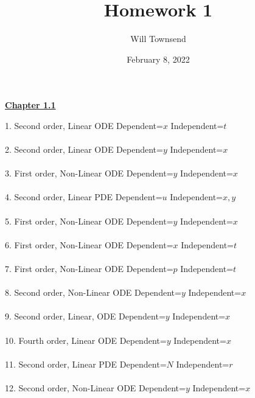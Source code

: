 \documentclass[12pt]{exam}
\title{Homework 1}
\author{Will Townsend}
\date{February 8, 2022}
\begin{document}
\maketitle

\begin{center}\Large{\textbf{\underline{Chapter 1.1}}}\end{center}
1. Second order, Linear ODE Dependent=$x$ Independent=$t$\\\\
2. Second order, Linear ODE Dependent=$y$ Independent=$x$\\\\
3. First order, Non-Linear ODE Dependent=$y$ Independent=$x$\\\\
4. Second order, Linear PDE Dependent=$u$ Independent=$x,y$\\\\
5. First order, Non-Linear ODE Dependent=$y$ Independent=$x$\\\\
6. First order, Non-Linear ODE Dependent=$x$ Independent=$t$\\\\
7. First order, Non-Linear ODE Dependent=$p$ Independent=$t$\\\\
8. Second order, Non-Linear ODE Dependent=$y$ Independent=$x$\\\\
9. Second order, Linear, ODE Dependent=$y$ Independent=$x$\\\\
10. Fourth order, Linear ODE Dependent=$y$ Independent=$x$\\\\
11. Second order, Linear PDE Dependent=$N$ Independent=$r$\\\\
12. Second order, Non-Linear ODE Dependent=$y$ Independent=$x$\\

\pagebreak
\end{document}
